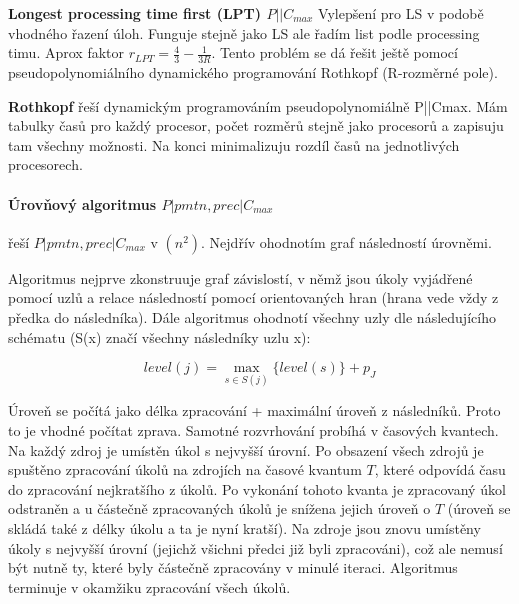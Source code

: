 \textbf{Longest processing time first (LPT) $P||C_{max}$} Vylepšení pro LS v podobě vhodného řazení úloh. Funguje stejně jako LS ale řadím list podle processing timu. Aprox faktor $r_{LPT} = \frac{4}{3} - \frac{1}{3R}$. Tento problém se dá řešit ještě pomocí pseudopolynomiálního dynamického programování Rothkopf (R-rozměrné pole).

\textbf{Rothkopf} řeší dynamickým programováním pseudopolynomiálně P||Cmax. Mám tabulky časů pro každý procesor, počet rozměrů stejně jako procesorů a zapisuju tam všechny možnosti. Na konci minimalizuju rozdíl časů na jednotlivých procesorech.

\paragraph{Úrovňový algoritmus $P|pmtn,prec|C_{max}$} řeší $P|pmtn,prec|C_{max}$ v $(n^2)$. Nejdřív ohodnotím graf následností úrovněmi.

Algoritmus nejprve zkonstruuje graf závislostí, v němž jsou úkoly vyjádřené pomocí uzlů a relace následností pomocí orientovaných hran (hrana vede vždy z předka do následníka). Dále algoritmus ohodnotí všechny uzly dle následujícího schématu (S(x) značí všechny následníky uzlu x):

$$level(j) = \max_{s \in S(j)}\{level(s)\} + p_J$$

Úroveň se počítá jako délka zpracování + maximální úroveň z následníků. Proto to je vhodné počítat zprava. Samotné rozvrhování probíhá v časových kvantech. Na každý zdroj je umístěn úkol s nejvyšší úrovní. Po obsazení všech zdrojů je spuštěno zpracování úkolů na zdrojích na časové kvantum $T$, které odpovídá času do zpracování nejkratšího z úkolů. Po vykonání tohoto kvanta je zpracovaný úkol odstraněn a u částečně zpracovaných úkolů je snížena jejich úroveň o $T$ (úroveň se skládá také z délky úkolu a ta je nyní kratší). Na zdroje jsou znovu umístěny úkoly s nejvyšší úrovní (jejichž všichni předci již byli zpracováni), což ale nemusí být nutně ty, které byly částečně zpracovány v minulé iteraci. Algoritmus terminuje v okamžiku zpracování všech úkolů.

